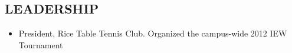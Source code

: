 \documentclass[margin]{res}
\begin{document}
\begin{resume}

\section{LEADERSHIP}
\begin{itemize}                                                 \itemsep1pt
        \item   President, Rice Table Tennis Club. Organized the campus-wide 2012 IEW Tournament
\end{itemize}

\end{resume}
\end{document}
